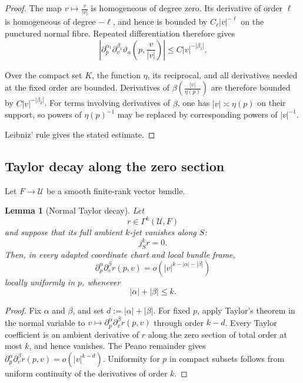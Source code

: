 \documentclass[11pt]{article}
\theoremstyle{plain}
\newtheorem{lemma}[theorem]{Lemma}
\theoremstyle{definition}
\begin{document}
\begin{proof}
The map \(v\longmapsto\frac{v}{|v|}\) is homogeneous of degree zero. Its derivative of order \(\ell\) is
homogeneous of degree \(-\ell\), and hence is bounded by \(C_\ell|v|^{-\ell}\) on the punctured normal fibre. Repeated differentiation therefore
gives
\[
  \left|
    \partial_p^{\alpha_1}
    \partial_v^{\beta_1}
    \vartheta_a
    \left(
      p,\frac{v}{|v|}
    \right)
  \right|
  \leq
  C
  |v|^{-|\beta_1|}.
\]

Over the compact set \(K\), the function \(\eta\), its reciprocal, and
all derivatives needed at the fixed order are bounded. Derivatives of \(\beta \left( \frac{|v|}{\eta(p)} \right)\) are therefore bounded by
\(C|v|^{-|\beta_2|}\).
For terms involving derivatives of \(\beta\), one has \(|v|\asymp\eta(p)\) on their support, so powers of \(\eta(p)^{-1}\) may be replaced by
corresponding powers of \(|v|^{-1}\).

Leibniz' rule gives the stated estimate.
\end{proof}

\subsection{Taylor decay along the zero section}
\label{appsubsec:taylor-decay}

Let \(F\longrightarrow\mathcal U\) be a smooth finite-rank vector bundle.

\begin{lemma}[Normal Taylor decay]
\label{lem:normal-taylor-decay}
Let
\[
  r\in\Gamma^k(\mathcal U,F)
\]
and suppose that its full ambient \(k\)-jet vanishes along \(S\):
\[
  j_S^k r=0.
\]
Then, in every adapted coordinate chart and local bundle frame,
\[
  \boxed{
  \partial_p^\alpha
  \partial_v^\beta r(p,v)
  =
  o
  \left(
    |v|^{k-|\alpha|-|\beta|}
  \right)
  }
\]
locally uniformly in \(p\), whenever
\[
  |\alpha|+|\beta|\leq k.
\]
\end{lemma}

\begin{proof}
Fix \(\alpha\) and \(\beta\), and set
\(d:=|\alpha|+|\beta|\).
For fixed \(p\), apply Taylor's theorem in the normal variable to \(v\longmapsto \partial_p^\alpha \partial_v^\beta r(p,v)\) through order \(k-d\). Every Taylor coefficient is an ambient
derivative of \(r\) along the zero section of total order at most
\(k\), and hence vanishes. The Peano remainder gives
\(\partial_p^\alpha \partial_v^\beta r(p,v) = o \left( |v|^{k-d} \right)\).
Uniformity for \(p\) in compact subsets follows from uniform
continuity of the derivatives of order \(k\).
\end{proof}
\end{document}
